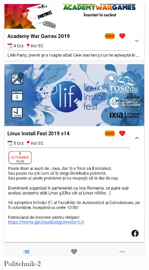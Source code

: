 \begin{figure}[!ht]
\begin{minipage}[b]{0.25\textwidth}
        \captionsetup{justification=centering}
        \includegraphics[width=\textwidth]{figures/app/miscellanous/politehnik-2.png}
        \caption{Politehnik-2}
        \label{4:fig:politehnik-2}
    \end{minipage}
    \hfill
    \begin{minipage}[b]{0.24\textwidth}
        \captionsetup{justification=centering}

\end{minipage}
\end{figure}
